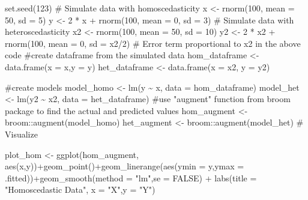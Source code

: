 \documentclass[
  letterpaper,
  paper =a4,
  twoside,
  openright,
  headsepline,
  footsepline,
  listof = totocnumbered,
  chapterprefix = true,
  firstiscover,
  parskip = full*]{scrbook}
\newenvironment{Shaded}{\begin{snugshade}}{\end{snugshade}}
\newcommand{\AttributeTok}[1]{\textcolor[rgb]{0.40,0.45,0.13}{#1}}
\newcommand{\CommentTok}[1]{\textcolor[rgb]{0.37,0.37,0.37}{#1}}
\newcommand{\ConstantTok}[1]{\textcolor[rgb]{0.56,0.35,0.01}{#1}}
\newcommand{\DecValTok}[1]{\textcolor[rgb]{0.68,0.00,0.00}{#1}}
\newcommand{\FunctionTok}[1]{\textcolor[rgb]{0.28,0.35,0.67}{#1}}
\newcommand{\NormalTok}[1]{\textcolor[rgb]{0.00,0.23,0.31}{#1}}
\newcommand{\OtherTok}[1]{\textcolor[rgb]{0.00,0.23,0.31}{#1}}
\newcommand{\SpecialCharTok}[1]{\textcolor[rgb]{0.37,0.37,0.37}{#1}}
\newcommand{\StringTok}[1]{\textcolor[rgb]{0.13,0.47,0.30}{#1}}
\begin{document}
\begin{Shaded}
\begin{Highlighting}[]
\FunctionTok{set.seed}\NormalTok{(}\DecValTok{123}\NormalTok{) }
\CommentTok{\# Simulate data with homoscedasticity }
\NormalTok{x }\OtherTok{\textless{}{-}} \FunctionTok{rnorm}\NormalTok{(}\DecValTok{100}\NormalTok{, }\AttributeTok{mean =} \DecValTok{50}\NormalTok{, }\AttributeTok{sd =} \DecValTok{5}\NormalTok{) }
\NormalTok{y }\OtherTok{\textless{}{-}} \DecValTok{2} \SpecialCharTok{*}\NormalTok{ x }\SpecialCharTok{+} \FunctionTok{rnorm}\NormalTok{(}\DecValTok{100}\NormalTok{, }\AttributeTok{mean =} \DecValTok{0}\NormalTok{, }\AttributeTok{sd =} \DecValTok{3}\NormalTok{)  }
\CommentTok{\# Simulate data with heteroscedasticity }
\NormalTok{x2 }\OtherTok{\textless{}{-}} \FunctionTok{rnorm}\NormalTok{(}\DecValTok{100}\NormalTok{, }\AttributeTok{mean =} \DecValTok{50}\NormalTok{, }\AttributeTok{sd =} \DecValTok{10}\NormalTok{) }
\NormalTok{y2 }\OtherTok{\textless{}{-}} \DecValTok{2} \SpecialCharTok{*}\NormalTok{ x2 }\SpecialCharTok{+} \FunctionTok{rnorm}\NormalTok{(}\DecValTok{100}\NormalTok{, }\AttributeTok{mean =} \DecValTok{0}\NormalTok{, }\AttributeTok{sd =}\NormalTok{ x2}\SpecialCharTok{/}\DecValTok{2}\NormalTok{)  }
\CommentTok{\# Error term proportional to x2 in the above code}
\CommentTok{\#create dataframe from the simulated data}
\NormalTok{hom\_dataframe }\OtherTok{\textless{}{-}} \FunctionTok{data.frame}\NormalTok{(}\AttributeTok{x =}\NormalTok{ x,}\AttributeTok{y =}\NormalTok{ y)}
\NormalTok{het\_dataframe }\OtherTok{\textless{}{-}} \FunctionTok{data.frame}\NormalTok{(}\AttributeTok{x =}\NormalTok{ x2, }\AttributeTok{y =}\NormalTok{ y2)}

\CommentTok{\#create models}
\NormalTok{model\_homo }\OtherTok{\textless{}{-}} \FunctionTok{lm}\NormalTok{(y }\SpecialCharTok{\textasciitilde{}}\NormalTok{ x, }\AttributeTok{data =}\NormalTok{ hom\_dataframe)}
\NormalTok{model\_het }\OtherTok{\textless{}{-}} \FunctionTok{lm}\NormalTok{(y2 }\SpecialCharTok{\textasciitilde{}}\NormalTok{ x2, }\AttributeTok{data =}\NormalTok{ het\_dataframe)}
\CommentTok{\#use "augment" function from broom package to find the actual and predicted values}
\NormalTok{hom\_augment }\OtherTok{\textless{}{-}}\NormalTok{ broom}\SpecialCharTok{::}\FunctionTok{augment}\NormalTok{(model\_homo)}
\NormalTok{het\_augment }\OtherTok{\textless{}{-}}\NormalTok{ broom}\SpecialCharTok{::}\FunctionTok{augment}\NormalTok{(model\_het)}
\CommentTok{\# Visualize  }

\NormalTok{plot\_hom }\OtherTok{\textless{}{-}} \FunctionTok{ggplot}\NormalTok{(hom\_augment, }\FunctionTok{aes}\NormalTok{(x,y))}\SpecialCharTok{+}\FunctionTok{geom\_point}\NormalTok{()}\SpecialCharTok{+}\FunctionTok{geom\_linerange}\NormalTok{(}\FunctionTok{aes}\NormalTok{(}\AttributeTok{ymin =}\NormalTok{ y,}\AttributeTok{ymax =}\NormalTok{ .fitted))}\SpecialCharTok{+}\FunctionTok{geom\_smooth}\NormalTok{(}\AttributeTok{method =} \StringTok{"lm"}\NormalTok{,}\AttributeTok{se =} \ConstantTok{FALSE}\NormalTok{) }\SpecialCharTok{+} \FunctionTok{labs}\NormalTok{(}\AttributeTok{title =} \StringTok{"Homoscedastic Data"}\NormalTok{, }\AttributeTok{x =} \StringTok{"X"}\NormalTok{,}\AttributeTok{y =} \StringTok{"Y"}\NormalTok{)}


\end{Highlighting}
\end{Shaded}
\end{document}
